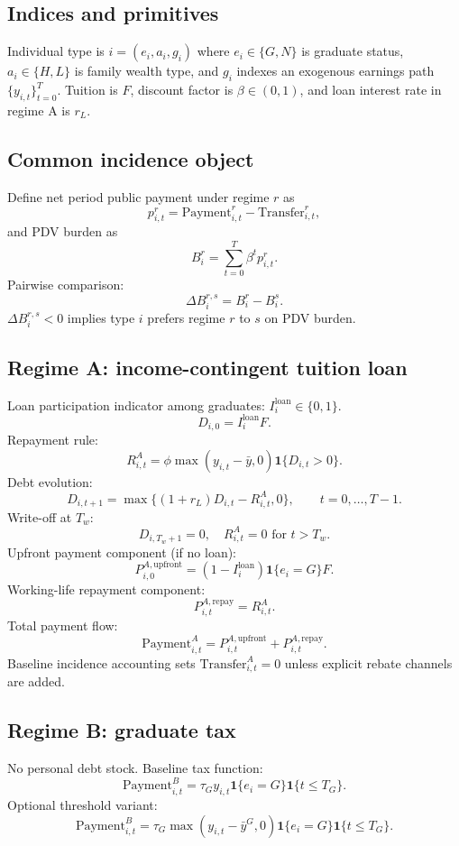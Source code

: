 \documentclass[11pt]{article}
\begin{document}
\subsection{Indices and primitives}
Individual type is $i=(e_i,a_i,g_i)$ where $e_i\in\{G,N\}$ is graduate status, $a_i\in\{H,L\}$ is family wealth type, and $g_i$ indexes an exogenous earnings path $\{y_{i,t}\}_{t=0}^{T}$. Tuition is $F$, discount factor is $\beta\in(0,1)$, and loan interest rate in regime A is $r_L$.

\subsection{Common incidence object}
Define net period public payment under regime $r$ as
\[
p_{i,t}^{r}=\text{Payment}_{i,t}^{r}-\text{Transfer}_{i,t}^{r},
\]
and PDV burden as
\[
B_i^{r}=\sum_{t=0}^{T}\beta^t p_{i,t}^{r}.
\]
Pairwise comparison:
\[
\Delta B_i^{r,s}=B_i^{r}-B_i^{s}.
\]
$\Delta B_i^{r,s}<0$ implies type $i$ prefers regime $r$ to $s$ on PDV burden.

\subsection{Regime A: income-contingent tuition loan}
Loan participation indicator among graduates: $I_i^{\text{loan}}\in\{0,1\}$.
\[
D_{i,0}=I_i^{\text{loan}}F.
\]
Repayment rule:
\[
R_{i,t}^{A}=\phi\max(y_{i,t}-\bar y,0)\mathbf{1}\{D_{i,t}>0\}.
\]
Debt evolution:
\[
D_{i,t+1}=\max\{(1+r_L)D_{i,t}-R_{i,t}^{A},0\},\qquad t=0,\dots,T-1.
\]
Write-off at $T_w$:
\[
D_{i,T_w+1}=0,\quad R_{i,t}^{A}=0\text{ for }t>T_w.
\]
Upfront payment component (if no loan):
\[
P_{i,0}^{A,\text{upfront}}=(1-I_i^{\text{loan}})\mathbf{1}\{e_i=G\}F.
\]
Working-life repayment component:
\[
P_{i,t}^{A,\text{repay}}=R_{i,t}^{A}.
\]
Total payment flow:
\[
\text{Payment}_{i,t}^{A}=P_{i,t}^{A,\text{upfront}}+P_{i,t}^{A,\text{repay}}.
\]
Baseline incidence accounting sets $\text{Transfer}_{i,t}^{A}=0$ unless explicit rebate channels are added.

\subsection{Regime B: graduate tax}
No personal debt stock. Baseline tax function:
\[
\text{Payment}_{i,t}^{B}=\tau_G y_{i,t}\mathbf{1}\{e_i=G\}\mathbf{1}\{t\le T_G\}.
\]
Optional threshold variant:
\[
\text{Payment}_{i,t}^{B}=\tau_G\max(y_{i,t}-\bar y^{G},0)\mathbf{1}\{e_i=G\}\mathbf{1}\{t\le T_G\}.
\]
\end{document}
